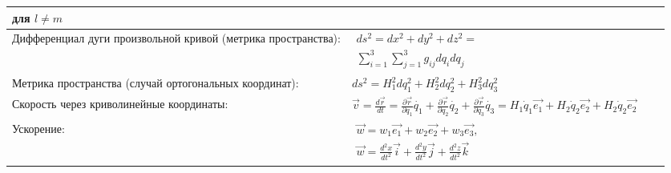 \documentclass{article}
\begin{document}
\begin{tabular}{ |p{3.8cm}|p{5.7cm}|p{3.8cm}|p{5.7cm}|  }
для $l \neq m$                                                               &  %
                                                                             &  %
                                                                             \\ %
\hline
Дифференциал дуги произвольной кривой (метрика пространства):                &  %
$\begin{aligned}
ds^2 = dx^2 + dy^2 + dz^2 =                       \\
\sum_{i = 1}^3 \sum_{j = 1}^3 g_{ij} dq_i dq_j
\end{aligned}$                                                               &  %
                                                                             &  %
                                                                             \\ %
\hline
Метрика пространства (случай ортогональных координат):                       &  %
$ds^2 = H_1^2 d q_1^2 + H_2^2 d q_2^2 + H_3^2 d q_3^2$                           &  %
                                                                             &  %
                                                                             \\ %
\hline
Скорость через криволинейные координаты:                                     &  %
$\vec{v} = \frac{d\vec{r}}{dt} =
 \frac{\partial \vec{r}}{\partial q_1} \dot{q_1} +
 \frac{\partial \vec{r}}{\partial q_2} \dot{q_2} +
 \frac{\partial \vec{r}}{\partial q_3} \dot{q_3} = 
H_1 \dot q_1 \vec{e_1} + H_2 \dot q_2 \vec{e_2} + H_2 \dot q_2 \vec{e_2}$    &  %
                                                                             &  %
                                                                             \\ %
\hline
Ускорение:                                                                   &  %
$\begin{aligned}
\vec{w} = w_1 \vec{e_1} + w_2 \vec{e_2} + w_3 \vec{e_3},               \\
\vec{w} = \frac{d^2 x}{d t^2} \vec{i} + \frac{d^2 y}{d t^2} \vec{j} +
\frac{d^2 z}{d t^2} \vec{k} 
\end{aligned}$                                                               &  %
                                                                             &  %
                                                                             \\ %

\end{tabular}
\end{document}
